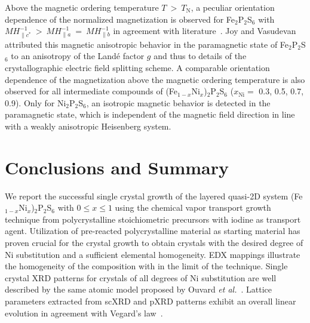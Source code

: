 \documentclass[twocolumn,superscriptaddress,prb,preprintnumbers,nobibnotes,aps]{revtex4-2}  %
\begin{document}
Above the magnetic ordering temperature $T~>~T_\textrm{N}$, a peculiar orientation dependence of the normalized magnetization is observed for Fe$_2$P$_2$S$_6$ with $MH^{-1}_{\parallel c^*}~>~MH^{-1}_{\parallel a}~=~MH^{-1}_{\parallel b}$ in agreement with literature~\cite{Jernberg1984,PJoy1992}. Joy and Vasudevan~\cite{PJoy1992} attributed this magnetic anisotropic behavior in the paramagnetic state of Fe$_2$P$_2$S$_6$ to an anisotropy of the Land\'{e} factor $g$ and thus to details of the crystallographic electric field splitting scheme. A comparable orientation dependence of the magnetization above the magnetic ordering temperature is also observed for all intermediate compounds of (Fe$_{1-x}$Ni$_x$)$_2$P$_2$S$_6$ ($x_\textrm{Ni} =$ 0.3, 0.5, 0.7, 0.9). Only for Ni$_2$P$_2$S$_6$, an isotropic magnetic behavior is detected in the paramagnetic state, which is independent of the magnetic field direction in line with a weakly anisotropic Heisenberg system.


\section{Conclusions and Summary}

We report the successful single crystal growth of the layered quasi-2D system (Fe$_{1-x}$Ni$_x$)$_2$P$_2$S$_6$ with $0 \leq x \leq 1$ using the chemical vapor transport growth technique from polycrystalline stoichiometric precursors with iodine as transport agent. Utilization of pre-reacted polycrystalline material as starting material has proven crucial for the crystal growth to obtain crystals with the desired degree of Ni substitution and a sufficient elemental homogeneity. EDX mappings illustrate the homogeneity of the composition with in the limit of the technique. Single crystal XRD patterns for crystals of all degrees of Ni substitution are well described by the same atomic model proposed by Ouvard \textit{et al.}~\cite{Ouvrard1985}. Lattice parameters extracted from scXRD and pXRD patterns exhibit an overall linear evolution in agreement with Vegard's law~\cite{Vegard1921}.
\end{document}
